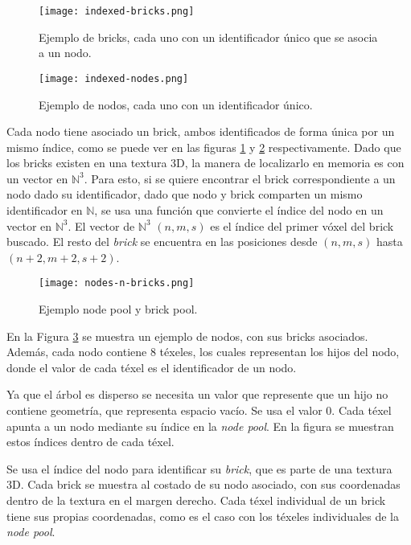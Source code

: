 \begin{figure}[h!]
    \centering
    \texttt{[image: indexed-bricks.png]}
    \caption{Ejemplo de bricks, cada uno con un identificador único que se asocia a un nodo.}
    \label{fig:indexed_bricks}
\end{figure}

\begin{figure}[h!]
    \centering
    \texttt{[image: indexed-nodes.png]}
    \caption{Ejemplo de nodos, cada uno con un identificador único.}
    \label{fig:indexed_nodes}
\end{figure}

Cada nodo tiene asociado un brick, ambos identificados de forma única por un mismo índice, como se puede ver en las figuras \ref{fig:indexed_bricks} y \ref{fig:indexed_nodes} respectivamente.
Dado que los bricks existen en una textura 3D, la manera de localizarlo en memoria es con un vector en $\mathbb{N}^3$.
Para esto, si se quiere encontrar el brick correspondiente a un nodo dado su identificador, dado que nodo y brick comparten un mismo identificador en $\mathbb{N}$, se usa una función que convierte el índice del nodo en un vector en $\mathbb{N}^3$.
El vector de $\mathbb{N}^3$ $(n, m, s)$ es el índice del primer vóxel del brick buscado.
El resto del \textit{brick} se encuentra en las posiciones desde $(n, m, s)$ hasta $(n + 2, m + 2, s + 2)$.

\begin{figure}[h!]
    \centering
    \texttt{[image: nodes-n-bricks.png]}
    \caption{Ejemplo node pool y brick pool.}
    \label{fig:nodes_n_bricks}
\end{figure}

En la Figura \ref{fig:nodes_n_bricks} se muestra un ejemplo de nodos, con sus bricks asociados.
Además, cada nodo contiene $8$ téxeles, los cuales representan los hijos del nodo, donde el valor de cada téxel es el identificador de un nodo.

Ya que el árbol es disperso se necesita un valor que represente que un hijo no contiene geometría, que representa espacio vacío.
Se usa el valor 0.
Cada téxel apunta a un nodo mediante su índice en la \textit{node pool}.
En la figura se muestran estos índices dentro de cada téxel.

Se usa el índice del nodo para identificar su \textit{brick}, que es parte de una textura 3D.
Cada brick se muestra al costado de su nodo asociado, con sus coordenadas dentro de la textura en el margen derecho.
Cada téxel individual de un brick tiene sus propias coordenadas, como es el caso con los téxeles individuales de la \textit{node pool}.

